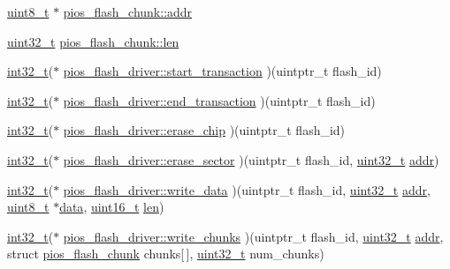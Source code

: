 \begin{DoxyCompactItemize}
\item 
\hyperlink{stdint_8h_aba7bc1797add20fe3efdf37ced1182c5}{uint8\-\_\-t} $\ast$ \hyperlink{group___p_i_o_s___f_l_a_s_h_ga7430a2f72409d31bba3f3f00e27a82bd}{pios\-\_\-flash\-\_\-chunk\-::addr}
\item 
\hyperlink{stdint_8h_a435d1572bf3f880d55459d9805097f62}{uint32\-\_\-t} \hyperlink{group___p_i_o_s___f_l_a_s_h_ga127467a644fb34d50d9c074535dcaec3}{pios\-\_\-flash\-\_\-chunk\-::len}
\item 
\hyperlink{group___n_a_m_e_gafd12020da5a235dfcf0c3c748fb5baed}{int32\-\_\-t}($\ast$ \hyperlink{group___p_i_o_s___f_l_a_s_h_ga3128721bfc5d4b157f9c8866d10d80f0}{pios\-\_\-flash\-\_\-driver\-::start\-\_\-transaction} )(uintptr\-\_\-t flash\-\_\-id)
\item 
\hyperlink{group___n_a_m_e_gafd12020da5a235dfcf0c3c748fb5baed}{int32\-\_\-t}($\ast$ \hyperlink{group___p_i_o_s___f_l_a_s_h_ga775db43adcb0c42ede668aef36016301}{pios\-\_\-flash\-\_\-driver\-::end\-\_\-transaction} )(uintptr\-\_\-t flash\-\_\-id)
\item 
\hyperlink{group___n_a_m_e_gafd12020da5a235dfcf0c3c748fb5baed}{int32\-\_\-t}($\ast$ \hyperlink{group___p_i_o_s___f_l_a_s_h_ga38768b3295a563897e91191bfead95b5}{pios\-\_\-flash\-\_\-driver\-::erase\-\_\-chip} )(uintptr\-\_\-t flash\-\_\-id)
\item 
\hyperlink{group___n_a_m_e_gafd12020da5a235dfcf0c3c748fb5baed}{int32\-\_\-t}($\ast$ \hyperlink{group___p_i_o_s___f_l_a_s_h_ga91676d432517e3a2ea7303a07cd1bde3}{pios\-\_\-flash\-\_\-driver\-::erase\-\_\-sector} )(uintptr\-\_\-t flash\-\_\-id, \hyperlink{stdint_8h_a435d1572bf3f880d55459d9805097f62}{uint32\-\_\-t} \hyperlink{group___c_m_s_i_s___core___instruction_interface_gae5c31572d72f992f107a67f7c4e80d5b}{addr})
\item 
\hyperlink{group___n_a_m_e_gafd12020da5a235dfcf0c3c748fb5baed}{int32\-\_\-t}($\ast$ \hyperlink{group___p_i_o_s___f_l_a_s_h_ga019d8ac125523464c1068f1170852dd0}{pios\-\_\-flash\-\_\-driver\-::write\-\_\-data} )(uintptr\-\_\-t flash\-\_\-id, \hyperlink{stdint_8h_a435d1572bf3f880d55459d9805097f62}{uint32\-\_\-t} \hyperlink{group___c_m_s_i_s___core___instruction_interface_gae5c31572d72f992f107a67f7c4e80d5b}{addr}, \hyperlink{stdint_8h_aba7bc1797add20fe3efdf37ced1182c5}{uint8\-\_\-t} $\ast$\hyperlink{pios__opahrs__proto_8h_a20e3f4bfaeccf09a75ef27e095a10112}{data}, \hyperlink{stdint_8h_a273cf69d639a59973b6019625df33e30}{uint16\-\_\-t} \hyperlink{mavlink__helpers_8h_aba59486c1504340293255a065b546e3a}{len})
\item 
\hyperlink{group___n_a_m_e_gafd12020da5a235dfcf0c3c748fb5baed}{int32\-\_\-t}($\ast$ \hyperlink{group___p_i_o_s___f_l_a_s_h_ga5bac463e83aa46ce41c151c74ff8467b}{pios\-\_\-flash\-\_\-driver\-::write\-\_\-chunks} )(uintptr\-\_\-t flash\-\_\-id, \hyperlink{stdint_8h_a435d1572bf3f880d55459d9805097f62}{uint32\-\_\-t} \hyperlink{group___c_m_s_i_s___core___instruction_interface_gae5c31572d72f992f107a67f7c4e80d5b}{addr}, struct \hyperlink{structpios__flash__chunk}{pios\-\_\-flash\-\_\-chunk} chunks\mbox{[}$\,$\mbox{]}, \hyperlink{stdint_8h_a435d1572bf3f880d55459d9805097f62}{uint32\-\_\-t} num\-\_\-chunks)

\end{DoxyCompactItemize}
